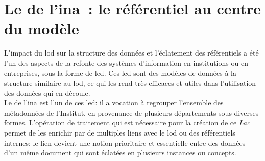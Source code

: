 \chapter{\label{III-B}Le \ldd de l’\ac{ina} : le référentiel au centre du modèle}

\lettrine{L}'impact du \ac{lod} sur la structure des données et l'éclatement des référentiels a été l'un des aspects de la refonte des systèmes d'information en institutions ou en entreprises, sous la forme de \ac{led}. Ces \ac{led} sont des modèles de données à la structure similaire au \ac{lod}, ce qui les rend très efficaces et utiles dans l'utilisation des données qui en découle.\\

Le \ldd de l'\ac{ina} est l'un de ces \ac{led}: il a vocation à regrouper l'ensemble des métadonnées de l'Institut, en provenance de plusieurs départements sous diverses formes.  L'opération de traitement qui est nécessaire pour la création de ce \textit{Lac} permet de les enrichir par de multiples liens avec le \ac{lod} ou des référentiels internes: le lien devient une notion prioritaire et essentielle entre des données d'un même document qui sont éclatées en plusieurs instances ou concepts.




